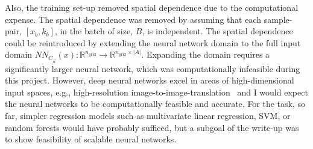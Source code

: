 \documentclass[letterpaper, 10 pt, conference, twocolumn]{ieeeconf}  %
\begin{document}
Also, the training set-up removed spatial dependence due to the computational expense. The spatial dependence was removed by assuming that each sample-pair, $[x_b,k_b]$, in the batch of size, $B$, is independent. The spatial dependence could be reintroduced by extending the neural network domain to the full input domain $NN_{C_{\vec\alpha}}(x):\mathds R^{n_{\text{grid}}} \rightarrow \mathds R^{n_{\text{grid}}\times \lvert A\rvert}$. Expanding the domain requires a significantly larger neural network, which was computationally infeasible during this project. However, deep neural networks excel in areas of high-dimensional input spaces, e.g., high-resolution image-to-image-translation~\cite{Isola_2017} and I would expect the neural networks to be computationally feasible and accurate. For the task, so far, simpler regression models such as multivariate linear regression, SVM, or random forests would have probably sufficed, but a subgoal of the write-up was to show feasibility of scalable neural networks. 
\end{document}

